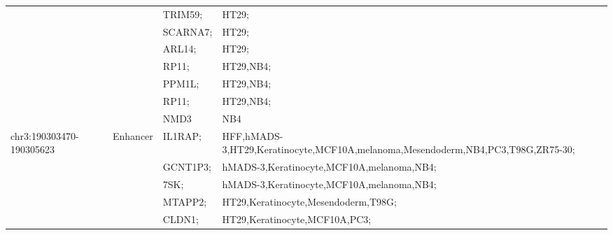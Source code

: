 \begin{table}[]
\begin{tabularx}{\textwidth}{lllX}
                                               &                            & TRIM59;     & HT29;                                                                           \\
                                               &                            & SCARNA7;    & HT29;                                                                           \\
                                               &                            & ARL14;      & HT29;                                                                           \\
                                               &                            & RP11;       & HT29,NB4;                                                                       \\
                                               &                            & PPM1L;      & HT29,NB4;                                                                       \\
                                               &                            & RP11;       & HT29,NB4;                                                                       \\
                                               &                            & NMD3        & NB4                                                                             \\
    \multirow{10}{*}{chr3:190303470-190305623} & \multirow{10}{*}{Enhancer} & IL1RAP;     & HFF,hMADS-3,HT29,Keratinocyte,MCF10A,\newline melanoma,Mesendoderm,NB4,PC3,T98G,ZR75-30; \\
                                               &                            & GCNT1P3;    & hMADS-3,Keratinocyte,MCF10A,melanoma,NB4;                                       \\
                                               &                            & 7SK;        & hMADS-3,Keratinocyte,MCF10A,melanoma,NB4;                                       \\
                                               &                            & MTAPP2;     & HT29,Keratinocyte,Mesendoderm,T98G;                                             \\
                                               &                            & CLDN1;      & HT29,Keratinocyte,MCF10A,PC3;                                                   \\

\end{tabularx}
\end{table}
